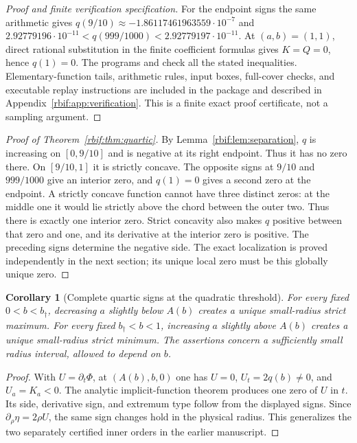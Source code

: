 \documentclass[11pt,a4paper]{article}
\newtheorem{corollary}[theorem]{Corollary}
\theoremstyle{definition}\newtheorem{definition}[theorem]{Definition}
\theoremstyle{remark}\newtheorem{remark}[theorem]{Remark}
\newcommand{\rbpb}{b_\dagger}
\numberwithin{equation}{section}
\begin{document}
\begin{proof}[Proof and finite verification specification]
For the endpoint signs the same arithmetic gives
$q(9/10)\approx-1.86117461963559\cdot10^{-7}$ and
$2.92779196\cdot10^{-11}<q(999/1000)<2.92779197\cdot10^{-11}$.
At $(a,b)=(1,1)$, direct rational substitution in the finite coefficient
formulas gives $K=Q=0$, hence $q(1)=0$.
The programs  and  check
all the stated inequalities. Elementary-function tails, arithmetic rules,
input boxes, full-cover checks, and executable replay instructions are
included in the package and described in
Appendix~\ref{rbif:app:verification}. This is a finite exact proof
certificate, not a sampling argument.
\end{proof}

\begin{proof}[Proof of Theorem~\ref{rbif:thm:quartic}]
By Lemma~\ref{rbif:lem:separation}, $q$ is increasing on $[0,9/10]$
and is negative at its right endpoint. Thus it has no zero there.
On $[9/10,1]$ it is strictly concave. The opposite signs at $9/10$
and $999/1000$ give an interior zero, and $q(1)=0$ gives a second zero
at the endpoint. A strictly concave function cannot have three distinct
zeros: at the middle one it would lie strictly above the chord between
the outer two. Thus there is exactly one interior zero. Strict concavity
also makes $q$ positive between that zero and one, and its derivative at
the interior zero is positive. The preceding signs determine the negative
side. The exact localization is proved independently in the next section;
its unique local zero must be this globally unique zero.
\end{proof}

\begin{corollary}[Complete quartic signs at the quadratic threshold]
\label{rbif:cor:localfamily}
For every fixed $0<b<\rbpb$, decreasing $a$ slightly below $A(b)$
creates a unique small-radius strict maximum. For every fixed
$\rbpb<b<1$, increasing $a$ slightly above $A(b)$ creates a unique
small-radius strict minimum. The assertions concern a sufficiently small
radius interval, allowed to depend on $b$.
\end{corollary}
\begin{proof}
With $U=\partial_t\Phi$, at $(A(b),b,0)$ one has
$U=0$, $U_t=2q(b)\ne0$, and $U_a=K_a<0$.
The analytic implicit-function theorem produces one zero of $U$ in $t$.
Its side, derivative sign, and extremum type follow from the displayed
signs. Since $\partial_\rho\eta=2\rho U$, the same sign changes hold
in the physical radius. This generalizes the two separately certified
inner orders in the earlier manuscript.
\end{proof}
\end{document}

